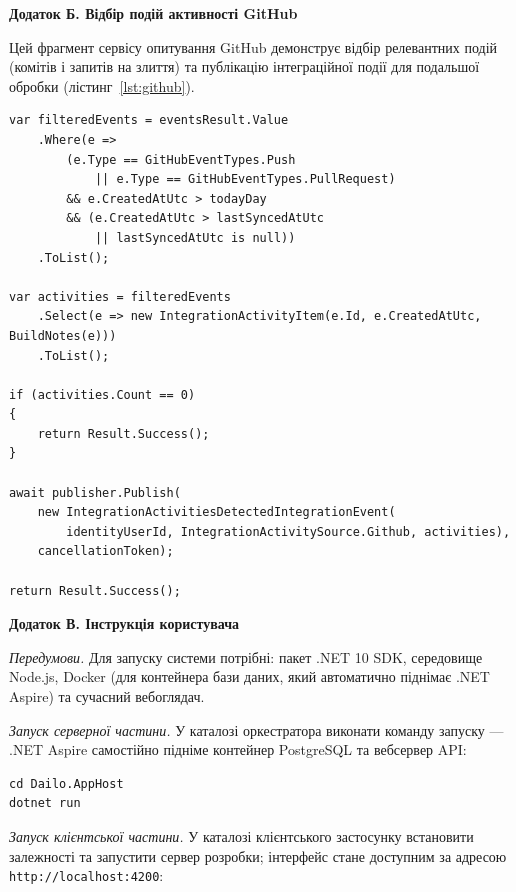 \vspace{1em}
\noindent\textbf{Додаток Б. Відбір подій активності GitHub}

\vspace{0.5em}
Цей фрагмент сервісу опитування GitHub демонструє відбір релевантних подій (комітів і запитів на злиття) та публікацію інтеграційної події для подальшої обробки (лістинг~\ref{lst:github}).

\begin{lstlisting}[style=nocodeframe, caption={Відбір подій GitHub та публікація інтеграційної події}, label={lst:github}]
var filteredEvents = eventsResult.Value
    .Where(e =>
        (e.Type == GitHubEventTypes.Push
            || e.Type == GitHubEventTypes.PullRequest)
        && e.CreatedAtUtc > todayDay
        && (e.CreatedAtUtc > lastSyncedAtUtc
            || lastSyncedAtUtc is null))
    .ToList();

var activities = filteredEvents
    .Select(e => new IntegrationActivityItem(e.Id, e.CreatedAtUtc, BuildNotes(e)))
    .ToList();

if (activities.Count == 0)
{
    return Result.Success();
}

await publisher.Publish(
    new IntegrationActivitiesDetectedIntegrationEvent(
        identityUserId, IntegrationActivitySource.Github, activities),
    cancellationToken);

return Result.Success();
\end{lstlisting}

\vspace{1em}
\noindent\textbf{Додаток В. Інструкція користувача}

\vspace{0.5em}
\textit{Передумови.} Для запуску системи потрібні: пакет .NET 10 SDK, середовище Node.js, Docker (для контейнера бази даних, який автоматично піднімає .NET Aspire) та сучасний вебоглядач.

\textit{Запуск серверної частини.} У каталозі оркестратора виконати команду запуску — .NET Aspire самостійно підніме контейнер PostgreSQL та вебсервер API:

\begin{lstlisting}[style=nocodeframe]
cd Dailo.AppHost
dotnet run
\end{lstlisting}

\textit{Запуск клієнтської частини.} У каталозі клієнтського застосунку встановити залежності та запустити сервер розробки; інтерфейс стане доступним за адресою \texttt{http://localhost:4200}:

